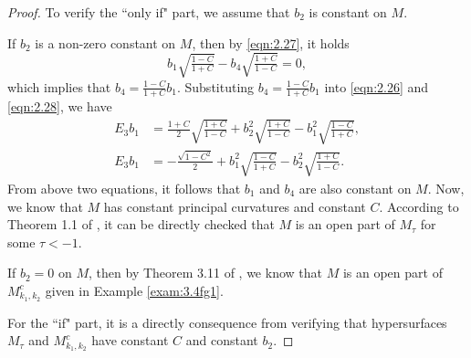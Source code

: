 \documentclass[reqno]{amsart}%
\theoremstyle{definition}
\newtheorem{remark}{Remark}[section]
\numberwithin{equation}{section}
\begin{document}
\begin{proof}
To verify the ``only if" part, we assume that $b_2$ is constant on $M$.

If $b_2$ is a non-zero constant on $M$, then by \eqref{eqn:2.27}, it holds
$$
b_1\sqrt{\tfrac{1-C}{1+C}}-b_4\sqrt{\tfrac{1+C}{1-C}}=0,
$$
which implies that $b_4=\frac{1-C}{1+C}b_1$.
Substituting $b_4=\frac{1-C}{1+C}b_1$ into \eqref{eqn:2.26} and \eqref{eqn:2.28}, we have
$$
\begin{aligned}
E_3b_1&=\tfrac{1+C}{2}\sqrt{\tfrac{1+C}{1-C}}+b_2^2\sqrt{\tfrac{1+C}{1-C}}
-b_1^2\sqrt{\tfrac{1-C}{1+C}},\\
E_3b_1&=-\tfrac{\sqrt{1-C^2}}{2}+b_1^2\sqrt{\tfrac{1-C}{1+C}}-b_2^2\sqrt{\tfrac{1+C}{1-C}}.
\end{aligned}
$$
From above two equations, it follows that $b_1$ and $b_4$ are also constant on $M$.
Now, we know that $M$ has constant principal curvatures and constant $C$.
According to Theorem 1.1 of \cite{GMY}, it can be directly checked that
$M$ is an open part of $M_\tau$ for some $\tau<-1$.

If $b_2=0$ on $M$, then by Theorem 3.11 of \cite{GMY}, we know that $M$ is an open part of $M_{k_1,k_2}^c$ given in Example \ref{exam:3.4fg1}.


For the ``if" part, it is a directly consequence from verifying that hypersurfaces $M_\tau$ and
$M_{k_1,k_2}^c$ have constant $C$ and constant $b_2$.
\end{proof}


\end{document}

